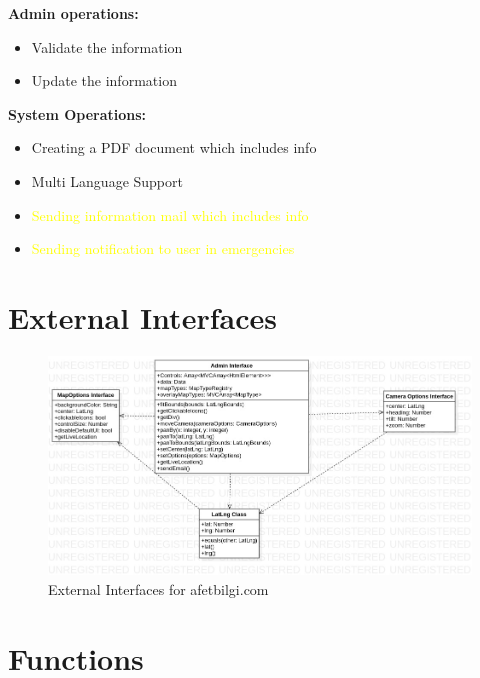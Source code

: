 \textbf{Admin operations: }
\begin{itemize}
    \item Validate the information
    \item Update the information
\end{itemize}

\textbf{System Operations: }
\begin{itemize}
    \item Creating a PDF document which includes info
    \item Multi Language Support
    \item \textcolor{yellow}{Sending information mail which includes info}
    \item \textcolor{yellow}{Sending notification to user in emergencies}
\end{itemize}

\section{External Interfaces}

\begin{figure}[H]
    \includegraphics[scale = 0.4]{assets/externalSuggestion.jpg}
    \caption[External Interfaces for afetbilgi.com]{External Interfaces for afetbilgi.com}
\end{figure}

\section{Functions}


